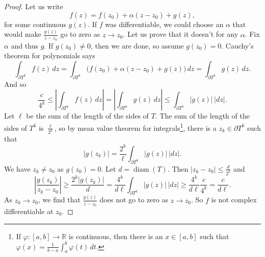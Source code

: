 \documentclass[12pt,openany]{book}
\newcommand{\sabs}[1]{\lvert {#1} \rvert}
\newcommand{\abs}[1]{\left\lvert {#1} \right\rvert}
\newcommand{\R}{{\mathbb{R}}}
\theoremstyle{plain}
\theoremstyle{remark}
\theoremstyle{definition}
\theoremstyle{exercise}
\theoremstyle{example}
\begin{document}
\begin{proof}
Let us write
\begin{equation*}
f(z) = f(z_0) + \alpha (z-z_0) + g(z) ,
\end{equation*}
for some continuous $g(z)$.
If $f$ was differentiable, we could choose an $\alpha$ that would make 
$\frac{g(z)}{z-z_0}$ go to zero as $z \to z_0$.
Let us prove that it doesn't for any $\alpha$.  Fix $\alpha$
and thus $g$.  If $g(z_0) \not= 0$,
then we are done, so assume $g(z_0) = 0$.
Cauchy's theorem for polynomials says
\begin{equation*}
\int_{\partial T^k} f(z) \, dz =
\int_{\partial T^k} \bigl( f(z_0) + \alpha (z-z_0) + g(z) \bigr) \, dz =
\int_{\partial T^k} g(z) \, dz .
\end{equation*}
And so
\begin{equation*}
\frac{c}{4^k} \leq
\abs{
\int_{\partial T^k} f(z) \, dz
} =
\abs{
\int_{\partial T^k} g(z) \, dz 
}
\leq
\int_{\partial T^k} \sabs{g(z)} \, \sabs{dz} .
\end{equation*}
Let $\ell$ be the sum of the length of the sides of $T$.
The sum of the length of the sides of $T^k$ is
$\frac{\ell}{2^k}$, so
by mean value theorem for integrals\footnote{%
If $\varphi \colon [a,b] \to \R$ is continuous, then there is an $x \in [a,b]$
such that $\varphi(x) = \frac{1}{b-a} \int_a^b \varphi(t) \, dt$.},
there is a $z_k \in \partial T^k$ such that
\begin{equation*}
\sabs{g(z_k)} = 
\frac{2^k}{\ell}
\int_{\partial T^k} \sabs{g(z)} \, \sabs{dz} .
\end{equation*}
We have $z_k \not= z_0$ as $g(z_0)=0$.
Let $d = \operatorname{diam}(T)$.  Then
$\sabs{z_k-z_0} \leq \frac{d}{2^k}$ and
\begin{equation*}
\abs{\frac{g(z_k)}{z_k-z_0}}
\geq
\frac{2^k\sabs{g(z_k)}}{d}
=
\frac{4^k}{d \ell}
\int_{\partial T^k} \sabs{g(z)} \, \sabs{dz}
\geq
\frac{4^k}{d \ell}
\frac{c}{4^k} = \frac{c}{d \ell} .
\end{equation*}
As $z_k \to z_0$, we find that $\frac{g(z)}{z-z_0}$ does not 
go to zero as $z \to z_0$.  So $f$ is not complex differentiable at $z_0$.
\end{proof}
\end{document}
